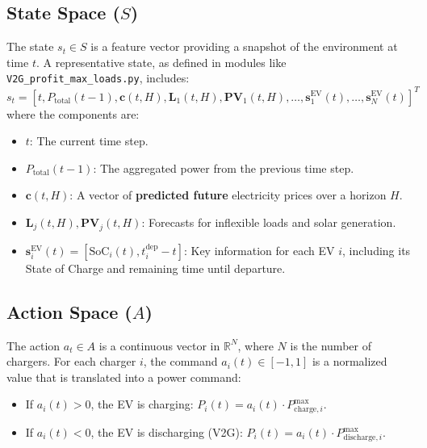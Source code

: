 \subsection{State Space ($S$)}
The state $s_t \in S$ is a feature vector providing a snapshot of the environment at time $t$. A representative state, as defined in modules like \texttt{V2G\_profit\_max\_loads.py}, includes:
\[
 s_t = [t, P_{\text{total}}(t-1), \mathbf{c}(t, H), \mathbf{L}_1(t, H), \mathbf{PV}_1(t, H), \dots, \mathbf{s}^{\text{EV}}_1(t), \dots, \mathbf{s}^{\text{EV}}_N(t)]^T
\]
where the components are:
\begin{itemize}
    \item $t$: The current time step.
    \item $P_{\text{total}}(t-1)$: The aggregated power from the previous time step.
    \item $\mathbf{c}(t, H)$: A vector of \textbf{predicted future} electricity prices over a horizon $H$.
    \item $\mathbf{L}_j(t, H), \mathbf{PV}_j(t, H)$: Forecasts for inflexible loads and solar generation.
    \item $\mathbf{s}^{\text{EV}}_i(t) = [\text{SoC}_i(t), t^{\text{dep}}_i - t]$: Key information for each EV $i$, including its State of Charge and remaining time until departure.
\end{itemize}

\subsection{Action Space ($A$)}
The action $a_t \in A$ is a continuous vector in $\mathbb{R}^N$, where $N$ is the number of chargers. For each charger $i$, the command $a_i(t) \in [-1, 1]$ is a normalized value that is translated into a power command:
\begin{itemize}
    \item If $a_i(t) > 0$, the EV is charging: $P_i(t) = a_i(t) \cdot P^{\text{max}}_{\text{charge}, i}$.
    \item If $a_i(t) < 0$, the EV is discharging (V2G): $P_i(t) = a_i(t) \cdot P^{\text{max}}_{\text{discharge}, i}$.
\end{itemize}

